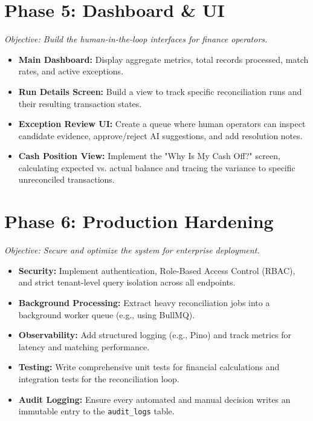 \documentclass[11pt,a4paper]{article}
\begin{document}
\section{Phase 5: Dashboard \& UI}
\textit{Objective: Build the human-in-the-loop interfaces for finance operators.}
\begin{itemize}[label=$\bullet$, leftmargin=*]
    \item \textbf{Main Dashboard:} Display aggregate metrics, total records processed, match rates, and active exceptions.
    \item \textbf{Run Details Screen:} Build a view to track specific reconciliation runs and their resulting transaction states.
    \item \textbf{Exception Review UI:} Create a queue where human operators can inspect candidate evidence, approve/reject AI suggestions, and add resolution notes.
    \item \textbf{Cash Position View:} Implement the "Why Is My Cash Off?" screen, calculating expected vs. actual balance and tracing the variance to specific unreconciled transactions.
\end{itemize}

\section{Phase 6: Production Hardening}
\textit{Objective: Secure and optimize the system for enterprise deployment.}
\begin{itemize}[label=$\bullet$, leftmargin=*]
    \item \textbf{Security:} Implement authentication, Role-Based Access Control (RBAC), and strict tenant-level query isolation across all endpoints.
    \item \textbf{Background Processing:} Extract heavy reconciliation jobs into a background worker queue (e.g., using BullMQ).
    \item \textbf{Observability:} Add structured logging (e.g., Pino) and track metrics for latency and matching performance.
    \item \textbf{Testing:} Write comprehensive unit tests for financial calculations and integration tests for the reconciliation loop.
    \item \textbf{Audit Logging:} Ensure every automated and manual decision writes an immutable entry to the \texttt{audit\_logs} table.
\end{itemize}
\end{document}
